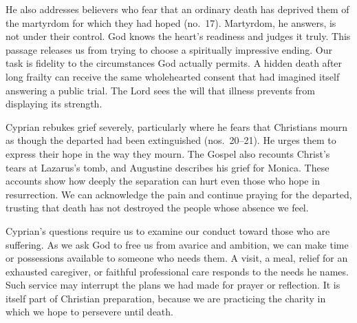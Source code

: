 He also addresses believers who fear that an ordinary death has deprived them of the martyrdom for which they had hoped (no.~17). Martyrdom, he answers, is not under their control. God knows the heart's readiness and judges it truly. This passage releases us from trying to choose a spiritually impressive ending. Our task is fidelity to the circumstances God actually permits. A hidden death after long frailty can receive the same wholehearted consent that had imagined itself answering a public trial. The Lord sees the will that illness prevents from displaying its strength.

Cyprian rebukes grief severely, particularly where he fears that Christians mourn as though the departed had been extinguished (nos.~20--21). He urges them to express their hope in the way they mourn. The Gospel also recounts Christ's tears at Lazarus's tomb, and Augustine describes his grief for Monica. These accounts show how deeply the separation can hurt even those who hope in resurrection. We can acknowledge the pain and continue praying for the departed, trusting that death has not destroyed the people whose absence we feel.

Cyprian's questions require us to examine our conduct toward those who are suffering. As we ask God to free us from avarice and ambition, we can make time or possessions available to someone who needs them. A visit, a meal, relief for an exhausted caregiver, or faithful professional care responds to the needs he names. Such service may interrupt the plans we had made for prayer or reflection. It is itself part of Christian preparation, because we are practicing the charity in which we hope to persevere until death.

